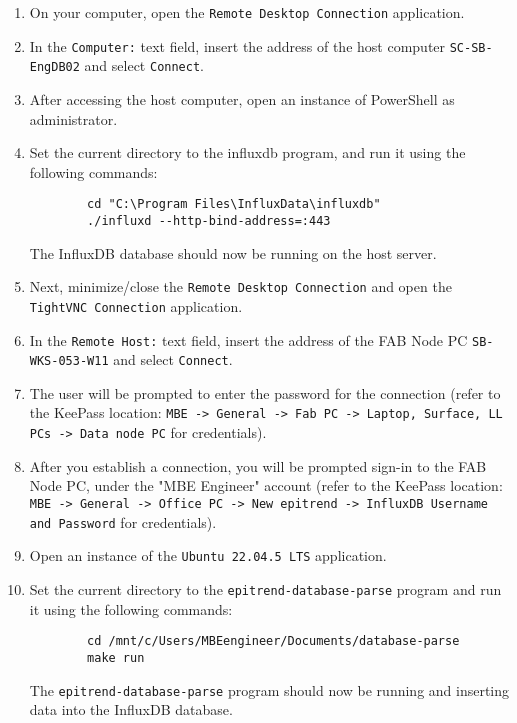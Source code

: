 \documentclass{article}
\begin{document}
\begin{enumerate}
    \item On your computer, open the \texttt{Remote Desktop Connection} application.

    \item In the \texttt{Computer:} text field, insert the address of the host computer \texttt{SC-SB-EngDB02} and select \texttt{Connect}.

    \item After accessing the host computer, open an instance of PowerShell as administrator.

    \item Set the current directory to the influxdb program, and run it using the following commands:
    \begin{verbatim}
        cd "C:\Program Files\InfluxData\influxdb"
        ./influxd --http-bind-address=:443
    \end{verbatim}
    The InfluxDB database should now be running on the host server.
    
    \item Next, minimize/close the \texttt{Remote Desktop Connection} and open the \texttt{TightVNC Connection} application.

    \item In the \texttt{Remote Host:} text field, insert the address of the FAB Node PC \texttt{SB-WKS-053-W11} and select \texttt{Connect}.

    \item The user will be prompted to enter the password for the connection (refer to the KeePass location: \texttt{MBE -> General -> Fab PC -> Laptop, Surface, LL PCs -> Data node PC} for credentials).

    \item After you establish a connection, you will be prompted sign-in to the FAB Node PC, under the "MBE Engineer" account (refer to the KeePass location: \texttt{MBE -> General -> Office PC -> New epitrend -> InfluxDB Username and Password} for credentials).

    \item Open an instance of the \texttt{Ubuntu 22.04.5 LTS} application.

    \item Set the current directory to the \texttt{epitrend-database-parse} program and run it using the following commands:
    \begin{verbatim}
        cd /mnt/c/Users/MBEengineer/Documents/database-parse
        make run
    \end{verbatim}
    The \texttt{epitrend-database-parse} program should now be running and inserting data into the InfluxDB database.

\end{enumerate}
\end{document}

